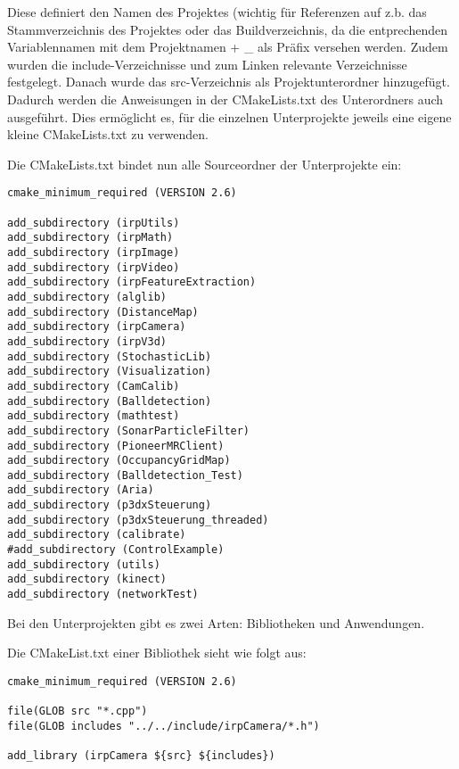 Diese definiert den Namen des Projektes (wichtig
für Referenzen auf z.b. das Stammverzeichnis des Projektes oder das
Buildverzeichnis, da die entprechenden Variablennamen mit dem Projektnamen
+ \_
als Präfix versehen werden. Zudem wurden die include-Verzeichnisse und zum
Linken relevante Verzeichnisse festgelegt. Danach wurde das src-Verzeichnis
 als
Projektunterordner hinzugefügt. Dadurch werden die Anweisungen in der
CMakeLists.txt des Unterordners auch ausgeführt. Dies ermöglicht es, für
die
einzelnen Unterprojekte jeweils eine eigene kleine CMakeLists.txt zu
verwenden.

Die CMakeLists.txt bindet nun alle Sourceordner der Unterprojekte ein:

\begin{lstlisting}[language={},captionpos=b,caption={CMakeLists.txt für den Sourceordner}]
%\begin{lstlisting}
cmake_minimum_required (VERSION 2.6)

add_subdirectory (irpUtils)
add_subdirectory (irpMath)
add_subdirectory (irpImage)
add_subdirectory (irpVideo)
add_subdirectory (irpFeatureExtraction)
add_subdirectory (alglib)
add_subdirectory (DistanceMap)
add_subdirectory (irpCamera)
add_subdirectory (irpV3d)
add_subdirectory (StochasticLib)
add_subdirectory (Visualization)
add_subdirectory (CamCalib)
add_subdirectory (Balldetection)
add_subdirectory (mathtest)
add_subdirectory (SonarParticleFilter)
add_subdirectory (PioneerMRClient)
add_subdirectory (OccupancyGridMap)
add_subdirectory (Balldetection_Test)
add_subdirectory (Aria)
add_subdirectory (p3dxSteuerung)
add_subdirectory (p3dxSteuerung_threaded)
add_subdirectory (calibrate)
#add_subdirectory (ControlExample)
add_subdirectory (utils)
add_subdirectory (kinect)
add_subdirectory (networkTest)
\end{lstlisting}

Bei den Unterprojekten gibt es zwei Arten: Bibliotheken und Anwendungen.

Die CMakeList.txt einer Bibliothek sieht wie folgt aus:
\begin{lstlisting}[language={},captionpos=b,caption={CMakeLists.txt einer Bibliothek am
    Beispiel irpCamera}]
%\begin{lstlisting}
cmake_minimum_required (VERSION 2.6)

file(GLOB src "*.cpp")
file(GLOB includes "../../include/irpCamera/*.h")

add_library (irpCamera ${src} ${includes})
\end{lstlisting}

